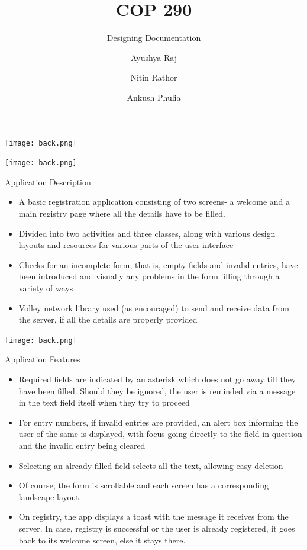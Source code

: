 \documentclass{beamer}
\title{COP 290}
\subtitle{Designing Documentation}
\author{Ayushya Raj \and Nitin Rathor \and Ankush Phulia}
\institute[IIT Delhi] 
{
  Department of Computer Science\\
  IIT Delhi}
\begin{document}
{\usebackgroundtemplate%
{\texttt{[image: back.png]}}
\begin{frame}
  \titlepage
\end{frame}
}
{\usebackgroundtemplate%
{\texttt{[image: back.png]}}
\begin{frame}{Application Description}{}
  \begin{itemize}
  \item {
   A basic registration application consisting of two screens- a welcome and a main registry page where all the details have to be filled.
  }
  \item {
    Divided into two activities and three classes, along with various design layouts and resources for various parts of the user interface
  }
  \item {
    Checks for an incomplete form, that is, empty fields and invalid entries, have been introduced and visually any problems in the form filling through a variety of ways
  }
  \item{
  Volley network library used (as encouraged) to send and receive data from the server, if all the details are properly provided
  }
  \end{itemize}
\end{frame}
}
{\usebackgroundtemplate%
{\texttt{[image: back.png]}}

\begin{frame}{Application Features}
  \begin{itemize}
  \item {
    Required fields are indicated by an asterisk which does not go away till they have been filled. Should they be ignored, the user is reminded via a message in the text field itself when they try to proceed
  }
  \item {   
    For entry numbers, if invalid entries are provided, an alert box informing the user of the same is displayed, with focus going directly to the field in question and the invalid entry being cleared
  }
  \item {
    Selecting an already filled field selects all the text, allowing easy deletion
  }
  \item {
    Of course, the form is scrollable and each screen has a corresponding landscape layout
  }
  \item {
    On registry, the app displays a toast with the message it receives from the server. In case, registry is successful or the user is already registered, it goes back to its welcome screen, else it stays there.
  }
  \end{itemize}
\end{frame}
}
\end{document}
